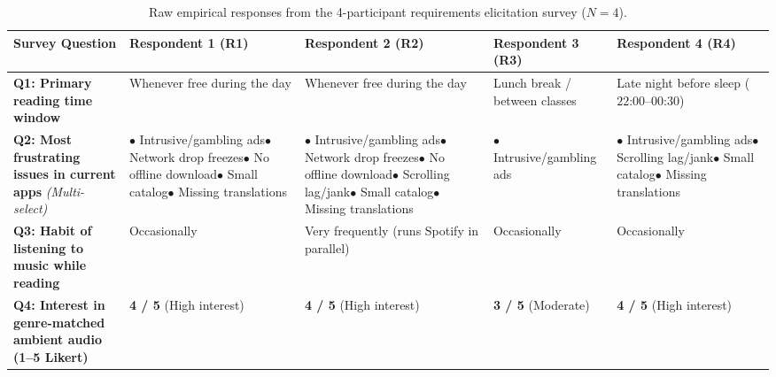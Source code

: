 \begin{table}[H]
\centering
\caption{Raw empirical responses from the 4-participant requirements elicitation survey ($N = 4$).}
\label{tab:survey_raw}
\scriptsize
\renewcommand{\arraystretch}{1.25}
\begin{tabularx}{\textwidth}{L{3.1cm} Y Y Y Y}
\toprule
{}
\textbf{Survey Question} & \textbf{Respondent 1 (R1)} & \textbf{Respondent 2 (R2)} & \textbf{Respondent 3 (R3)} & \textbf{Respondent 4 (R4)} \\
\midrule
\textbf{Q1: Primary reading time window} & Whenever free during the day & Whenever free during the day & Lunch break / between classes & Late night before sleep ($22\text{:}00\text{--}00\text{:}30$) \\
\textbf{Q2: Most frustrating issues in current apps} \textit{(Multi-select)} & $\bullet$ Intrusive/gambling ads\newline $\bullet$ Network drop freezes\newline $\bullet$ No offline download\newline $\bullet$ Small catalog\newline $\bullet$ Missing translations & $\bullet$ Intrusive/gambling ads\newline $\bullet$ Network drop freezes\newline $\bullet$ No offline download\newline $\bullet$ Scrolling lag/jank\newline $\bullet$ Small catalog\newline $\bullet$ Missing translations & $\bullet$ Intrusive/gambling ads & $\bullet$ Intrusive/gambling ads\newline $\bullet$ Scrolling lag/jank\newline $\bullet$ Small catalog\newline $\bullet$ Missing translations \\
\textbf{Q3: Habit of listening to music while reading} & Occasionally & Very frequently (runs Spotify in parallel) & Occasionally & Occasionally \\
\textbf{Q4: Interest in genre-matched ambient audio (1--5 Likert)} & \textbf{4 / 5} (High interest) & \textbf{4 / 5} (High interest) & \textbf{3 / 5} (Moderate) & \textbf{4 / 5} (High interest) \\

\end{tabularx}
\end{table}
